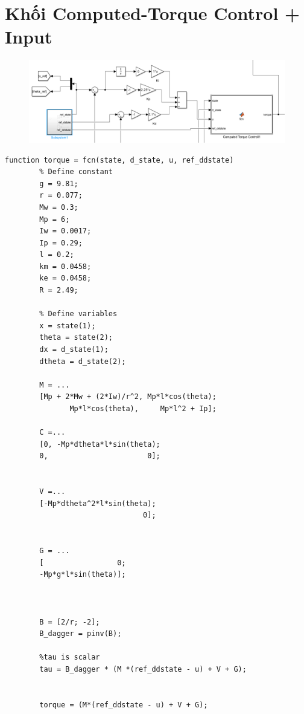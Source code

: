     \section{Khối Computed-Torque Control + Input}
    \begin{figure}[H]
        \centering
        \includegraphics[width=1\textwidth]{pictures/ref_ctc.png}
    \end{figure}
    \begin{lstlisting}[caption={Code khối Computed-Torque Control}, label={lst:step}]
        function torque = fcn(state, d_state, u, ref_ddstate)
        % Define constant
        g = 9.81;
        r = 0.077;
        Mw = 0.3;
        Mp = 6;
        Iw = 0.0017;
        Ip = 0.29;
        l = 0.2;
        km = 0.0458;
        ke = 0.0458;
        R = 2.49;     
        
        % Define variables
        x = state(1);
        theta = state(2);
        dx = d_state(1);
        dtheta = d_state(2);
               
        M = ... 
        [Mp + 2*Mw + (2*Iw)/r^2, Mp*l*cos(theta);
               Mp*l*cos(theta),     Mp*l^2 + Ip];        
         
        C =... 
        [0, -Mp*dtheta*l*sin(theta);
        0,                       0];
         
         
        V =... 
        [-Mp*dtheta^2*l*sin(theta);
                                0];
         
         
        G = ...
        [                 0;
        -Mp*g*l*sin(theta)];
        
        
        
        B = [2/r; -2];
        B_dagger = pinv(B); 
        
        %tau is scalar
        tau = B_dagger * (M *(ref_ddstate - u) + V + G);

        
        torque = (M*(ref_ddstate - u) + V + G);       
    \end{lstlisting}



    
